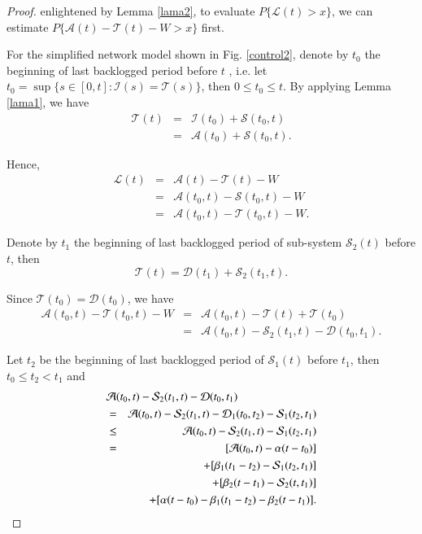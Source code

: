 \documentclass[paper]{ieice}
\newtheorem{proof}{Proof}
\begin{document}
\begin{proof}
enlightened by Lemma \ref{lama2}, to evaluate $P\{\mathcal{L}(t)>x\}$, we can estimate $P\{\mathcal{A}(t)-\mathcal{T}(t)-W>x\}$ first.

For the simplified network model shown in Fig. \ref{control2}, denote by $t_{0}$ the beginning of last backlogged period before $t$ \cite{Fidl06}, i.e. let $t_0=\sup\{s\in[0,t]:\mathcal{I}(s)=\mathcal{T}(s)\}$, then $0\leq t_{0}\leq t$. By applying Lemma \ref{lama1}, we have
\begin{eqnarray*}
  \mathcal{T}(t)&=&\mathcal{I}(t_{0})+\mathcal{S}(t_{0},t)\\
  &=& \mathcal{A}(t_{0})+\mathcal{S}(t_{0},t).
\end{eqnarray*}

Hence,
\begin{eqnarray*}
\mathcal{L}(t)&=&\mathcal{A}(t)-\mathcal{T}(t)-W\\
&=&\mathcal{A}(t_0,t)-\mathcal{S}(t_0,t)-W\\
&=&\mathcal{A}(t_0,t)-\mathcal{T}(t_0,t)-W.
\end{eqnarray*}

Denote by $t_1$ the beginning of last backlogged period of sub-system $\mathcal{S}_2(t)$ before $t$, then
$$\mathcal{T}(t)=\mathcal{D}(t_1)+\mathcal{S}_2(t_1,t).$$

Since $\mathcal{T}(t_0)=\mathcal{D}(t_0)$, we have
\begin{eqnarray*}
\mathcal{A}(t_0,t)-\mathcal{T}(t_0,t)-W &=& \mathcal{A}(t_0,t)-\mathcal{T}(t)+\mathcal{T}(t_0)\\
&=& \mathcal{A}(t_0,t)-\mathcal{S}_2(t_1,t)-\mathcal{D}(t_0,t_1).
\end{eqnarray*}

Let $t_2$ be the beginning of last backlogged period of $\mathcal{S}_1(t)$ before $t_1$, then $t_0\leq t_2< t_1$ and
\begin{eqnarray}
\lefteqn{\mathcal{A}(t_0,t)-\mathcal{S}_2(t_1,t)-\mathcal{D}(t_0,t_1)}\nonumber\\
&=& \mathcal{A}(t_0,t)-\mathcal{S}_2(t_1,t)-\mathcal{D}_1(t_0,t_2)-\mathcal{S}_1(t_2,t_1)\nonumber\\
&\leq& \mathcal{A}(t_0,t)-\mathcal{S}_2(t_1,t)-\mathcal{S}_1(t_2,t_1)\nonumber\\
&=& [\mathcal{A}(t_0,t)-\alpha(t-t_0)]\nonumber\\
&& +[\beta_1(t_1-t_2)-\mathcal{S}_1(t_2,t_1)]\nonumber\\
&& +[\beta_2(t-t_1)-\mathcal{S}_2(t,t_1)]\nonumber\\
&& +[\alpha(t-t_0)-\beta_1(t_1-t_2)-\beta_2(t-t_1)].\label{initial}
\end{eqnarray}


\end{proof}
\end{document}
